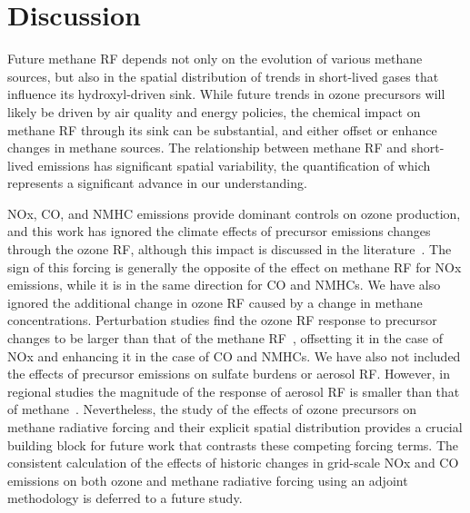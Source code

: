 \section{Discussion}

Future methane RF depends not only on the evolution of various methane sources, but also in the spatial distribution of trends in short-lived gases that influence its hydroxyl-driven sink. While future trends in ozone precursors will likely be driven by air quality and energy policies, the chemical impact on methane RF through its sink can be substantial, and either offset or enhance changes in methane sources. The relationship between methane RF and short-lived emissions has significant spatial variability, the quantification of which represents a significant advance in our understanding.

NOx, CO, and NMHC emissions provide dominant controls on ozone production, and this work has ignored the climate effects of precursor emissions changes through the ozone RF, although this impact is discussed in the literature~\citep{ref:naik2005,ref:bowman2012,ref:shindell2013}. The sign of this forcing is generally the opposite of the effect on methane RF for NOx emissions, while it is in the same direction for CO and NMHCs. We have also ignored the additional change in ozone RF caused by a change in methane concentrations. Perturbation studies find the ozone RF response to precursor changes to be larger than that of the methane RF~\citep{ref:akimoto2015}, offsetting it in the case of NOx and enhancing it in the case of CO and NMHCs. We have also not included the effects of precursor emissions on sulfate burdens or aerosol RF. However, in regional studies the magnitude of the response of aerosol RF is smaller than that of methane~\citep{ref:fry2012}. Nevertheless, the study of the effects of ozone precursors on methane radiative forcing and their explicit spatial distribution provides a crucial building block for future work that contrasts these competing forcing terms. The consistent calculation of the effects of historic changes in grid-scale NOx and CO emissions on both ozone and methane radiative forcing using an adjoint methodology is deferred to a future study.





